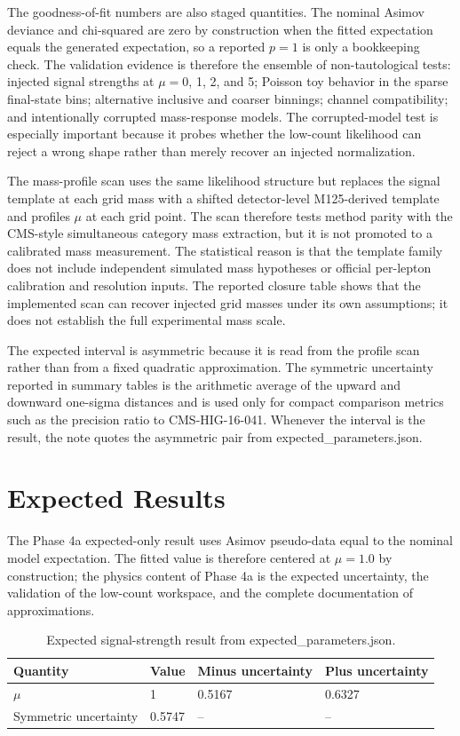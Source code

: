\documentclass[11pt]{article}
\begin{document}
The goodness-of-fit numbers are also staged quantities. The nominal Asimov deviance and chi-squared are zero by construction when the fitted expectation equals the generated expectation, so a reported $p=1$ is only a bookkeeping check. The validation evidence is therefore the ensemble of non-tautological tests: injected signal strengths at $\mu=0$, 1, 2, and 5; Poisson toy behavior in the sparse final-state bins; alternative inclusive and coarser binnings; channel compatibility; and intentionally corrupted mass-response models. The corrupted-model test is especially important because it probes whether the low-count likelihood can reject a wrong shape rather than merely recover an injected normalization.

The mass-profile scan uses the same likelihood structure but replaces the signal template at each grid mass with a shifted detector-level M125-derived template and profiles $\mu$ at each grid point. The scan therefore tests method parity with the CMS-style simultaneous category mass extraction, but it is not promoted to a calibrated mass measurement. The statistical reason is that the template family does not include independent simulated mass hypotheses or official per-lepton calibration and resolution inputs. The reported closure table shows that the implemented scan can recover injected grid masses under its own assumptions; it does not establish the full experimental mass scale.

The expected interval is asymmetric because it is read from the profile scan rather than from a fixed quadratic approximation. The symmetric uncertainty reported in summary tables is the arithmetic average of the upward and downward one-sigma distances and is used only for compact comparison metrics such as the precision ratio to CMS-HIG-16-041. Whenever the interval is the result, the note quotes the asymmetric pair from expected\_parameters.json.
\section{Expected Results}
The Phase 4a expected-only result uses Asimov pseudo-data equal to the nominal model expectation. The fitted value is therefore centered at $\mu=1.0$ by construction; the physics content of Phase 4a is the expected uncertainty, the validation of the low-count workspace, and the complete documentation of approximations.

\begin{table}[htbp]
\centering
\caption{Expected signal-strength result from expected\_parameters.json.}
\begin{tabular}{llll}
\toprule
Quantity & Value & Minus uncertainty & Plus uncertainty \\ 
\midrule
$\mu$ & 1 & 0.5167 & 0.6327 \\
Symmetric uncertainty & 0.5747 & -- & -- \\ 
\bottomrule
\end{tabular}
\label{tab:mu-result}
\end{table}
\end{document}
